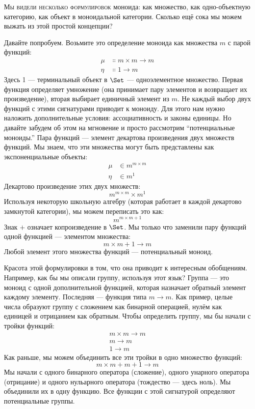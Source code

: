 
\lettrine[lhang=0.17]{М}{ы видели несколько формулировок} моноида: как множество, как
одно-объектную категорию, как объект в моноидальной категории. Сколько ещё
сока мы можем выжать из этой простой концепции?

Давайте попробуем. Возьмите это определение моноида как множества $m$ с
парой функций:
\begin{align*}
  \mu  & \Colon m\times{}m \to m \\
  \eta & \Colon 1 \to m
\end{align*}
Здесь 1 --- терминальный объект в $\Set$ --- одноэлементное множество.
Первая функция определяет умножение (она принимает пару элементов
и возвращает их произведение), вторая выбирает единичный элемент из
$m$. Не каждый выбор двух функций с этими сигнатурами
приводит к моноиду. Для этого нам нужно наложить дополнительные условия:
ассоциативность и законы единицы. Но давайте забудем об этом на мгновение
и просто рассмотрим ``потенциальные моноиды.'' Пара функций --- элемент
декартова произведения двух множеств функций. Мы знаем, что
эти множества могут быть представлены как экспоненциальные объекты:
\begin{align*}
  \mu  & \in m^{m\times{}m} \\
  \eta & \in m^1
\end{align*}
Декартово произведение этих двух множеств:
\[m^{m\times{}m}\times{}m^1\]
Используя некоторую школьную алгебру (которая работает в каждой декартово замкнутой
категории), мы можем переписать это как:
\[m^{m\times{}m + 1}\]
Знак $+$ означает копроизведение в $\Set$. Мы только что
заменили пару функций одной функцией --- элементом
множества:
\[m\times{}m + 1 \to m\]
Любой элемент этого множества функций --- потенциальный моноид.

Красота этой формулировки в том, что она приводит к интересным
обобщениям. Например, как бы мы описали группу, используя этот
язык? Группа --- это моноид с одной дополнительной функцией, которая назначает
обратный элемент каждому элементу. Последняя --- функция типа
$m \to m$. Как пример, целые числа образуют группу с
сложением как бинарной операцией, нулём как единицей и отрицанием как
обратным. Чтобы определить группу, мы бы начали с тройки функций:
\begin{align*}
  m\times{}m \to m \\
  m \to m          \\
  1 \to m
\end{align*}
Как раньше, мы можем объединить все эти тройки в одно множество функций:
\[m\times{}m + m + 1 \to m\]
Мы начали с одного бинарного оператора (сложение), одного унарного оператора
(отрицание) и одного нульарного оператора (тождество --- здесь ноль). Мы
объединили их в одну функцию. Все функции с этой сигнатурой
определяют потенциальные группы.

